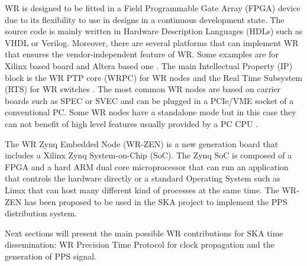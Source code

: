 
WR is designed to be fitted in a Field Programmable Gate Array (FPGA) device due to its flexibility to use in designs in a continuous development state. The source code is mainly written in Hardware Description Languages (HDLs) such as VHDL or Verilog. Moreover, there are several platforms that can implement WR that ensures the vendor-independent feature of WR. Some examples are \cite{ohwr:spec} for Xilinx based board and Altera based one \cite{ohwr:altera}.  The main Intellectual Property (IP) block is the WR PTP core (WRPC) for WR nodes and the Real Time Subsystem (RTS) for WR switches . The most common WR nodes are based on carrier boards such as SPEC or SVEC and can be plugged in a PCIe/VME socket of a conventional PC. Some WR nodes have a standalone mode but in this case they can not benefit of high level features usually provided by a PC CPU				.

The WR Zynq Embedded Node (WR-ZEN) is a new generation board that includes a Xilinx Zynq System-on-Chip (SoC). The Zynq SoC is composed of a FPGA and a hard ARM dual core microprocessor that can run an application that controls the hardware directly or a standard Operating System such as Linux that can host many different kind of processes at the same time. The WR-ZEN has been proposed to be used in the SKA project to implement the PPS distribution system.

Next sections will present the main possible WR contributions for SKA time dissemination: WR Precision Time Protocol for clock propagation and the generation of PPS signal. 
